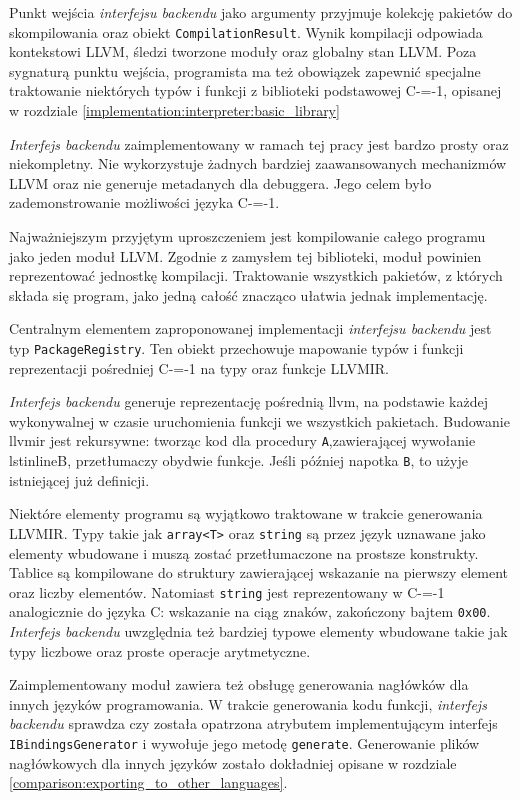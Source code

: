 Punkt wejścia \emph{interfejsu backendu} jako argumenty przyjmuje kolekcję pakietów do skompilowania oraz obiekt \lstinline{CompilationResult}.
Wynik kompilacji odpowiada kontekstowi LLVM, śledzi tworzone moduły oraz globalny stan LLVM.
Poza sygnaturą punktu wejścia, programista ma też obowiązek zapewnić specjalne traktowanie niektórych typów i funkcji z biblioteki podstawowej C-=-1, opisanej w rozdziale \ref{implementation:interpreter:basic_library}

\emph{Interfejs backendu} zaimplementowany w ramach tej pracy jest bardzo prosty oraz niekompletny.
Nie wykorzystuje żadnych bardziej zaawansowanych mechanizmów LLVM oraz nie generuje metadanych dla debuggera.
Jego celem było zademonstrowanie możliwości języka C-=-1.

Najważniejszym przyjętym uproszczeniem jest kompilowanie całego programu jako jeden moduł LLVM.
Zgodnie z zamysłem tej biblioteki, moduł powinien reprezentować jednostkę kompilacji.
Traktowanie wszystkich pakietów, z których składa się program, jako jedną całość znacząco ułatwia jednak implementację.

Centralnym elementem zaproponowanej implementacji \emph{interfejsu backendu} jest typ \lstinline{PackageRegistry}.
Ten obiekt przechowuje mapowanie typów i funkcji reprezentacji pośredniej C-=-1 na typy oraz funkcje LLVMIR.

\emph{Interfejs backendu} generuje reprezentację pośrednią llvm, na podstawie każdej wykonywalnej w czasie uruchomienia funkcji we wszystkich pakietach.
Budowanie llvmir jest rekursywne: tworząc kod dla procedury \lstinline{A},zawierającej wywołanie lstinline{B}, przetłumaczy obydwie funkcje.
Jeśli później napotka \lstinline{B}, to użyje istniejącej już definicji.

Niektóre elementy programu są wyjątkowo traktowane w trakcie generowania LLVMIR.
Typy takie jak \lstinline{array<T>} oraz \lstinline{string} są przez język uznawane jako elementy wbudowane i muszą zostać przetłumaczone na prostsze konstrukty.
Tablice są kompilowane do struktury zawierającej wskazanie na pierwszy element oraz liczby elementów.
Natomiast \lstinline{string} jest reprezentowany w C-=-1 analogicznie do języka C: wskazanie na ciąg znaków, zakończony bajtem \lstinline{0x00}.
\emph{Interfejs backendu} uwzględnia też bardziej typowe elementy wbudowane takie jak typy liczbowe oraz proste operacje arytmetyczne.

Zaimplementowany moduł zawiera też obsługę generowania nagłówków dla innych języków programowania.
W trakcie generowania kodu funkcji, \emph{interfejs backendu} sprawdza czy została opatrzona atrybutem implementującym interfejs \lstinline{IBindingsGenerator} i wywołuje jego metodę \lstinline{generate}.
Generowanie plików nagłówkowych dla innych języków zostało dokładniej opisane w rozdziale \ref{comparison:exporting_to_other_languages}.

